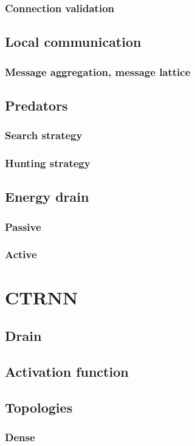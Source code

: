 		\subsubsection{Connection validation}
	\subsection{Local communication}
		\subsubsection{Message aggregation, message lattice}
	\subsection{Predators}
		\subsubsection{Search strategy}
		\subsubsection{Hunting strategy}
	\subsection{Energy drain}
		\subsubsection{Passive}
		\subsubsection{Active}

\section{CTRNN}
	\subsection{Drain}
	\subsection{Activation function}
	\subsection{Topologies}
		\subsubsection{Dense}
